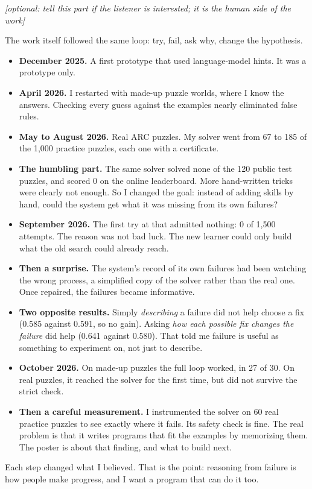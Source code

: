 \documentclass[11pt]{article}
\newcommand{\cue}[1]{{\color{ink2}\textit{[#1]}}\par}
\newcommand{\panel}[1]{\par\vspace{0.7em}{\large\bfseries\color{accent}#1}\par\vspace{0.05em}}
\begin{document}
\panel{My journey: ten months of changing my mind}
\cue{optional: tell this part if the listener is interested; it is the human side of the work}
The work itself followed the same loop: try, fail, ask why, change the hypothesis.
\begin{itemize}
  \item \textbf{December 2025.} A first prototype that used language-model hints. It was a prototype only.
  \item \textbf{April 2026.} I restarted with made-up puzzle worlds, where I know the answers. Checking
    every guess against the examples nearly eliminated false rules.
  \item \textbf{May to August 2026.} Real ARC puzzles. My solver went from 67 to 185 of the 1,000 practice
    puzzles, each one with a certificate.
  \item \textbf{The humbling part.} The same solver solved none of the 120 public test puzzles, and scored
    0 on the online leaderboard. More hand-written tricks were clearly not enough. So I changed the goal:
    instead of adding skills by hand, could the system get what it was missing from its own failures?
  \item \textbf{September 2026.} The first try at that admitted nothing: 0 of 1,500 attempts. The reason
    was not bad luck. The new learner could only build what the old search could already reach.
  \item \textbf{Then a surprise.} The system's record of its own failures had been watching the wrong
    process, a simplified copy of the solver rather than the real one. Once repaired, the failures became
    informative.
  \item \textbf{Two opposite results.} Simply \emph{describing} a failure did not help choose a fix (0.585
    against 0.591, so no gain). Asking \emph{how each possible fix changes the failure} did help (0.641
    against 0.580). That told me failure is useful as something to experiment on, not just to describe.
  \item \textbf{October 2026.} On made-up puzzles the full loop worked, in 27 of 30. On real puzzles, it
    reached the solver for the first time, but did not survive the strict check.
  \item \textbf{Then a careful measurement.} I instrumented the solver on 60 real practice puzzles to see
    exactly where it fails. Its safety check is fine. The real problem is that it writes programs that fit
    the examples by memorizing them. The poster is about that finding, and what to build next.
\end{itemize}
Each step changed what I believed. That is the point: reasoning from failure is how people make progress,
and I want a program that can do it too.
\end{document}
